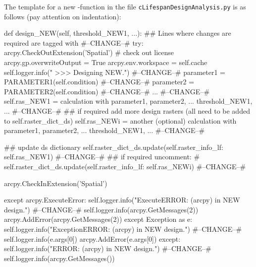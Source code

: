 \clearpage
The template for a new -function in the file \texttt{cLifespanDesignAnalysis.py} is as follows (pay attention on indentation):\\
\begin{python}
 def design_NEW(self, threshold_NEW1, ...):
     ## Lines where changes are required are tagged with #--CHANGE--#
     try:
      arcpy.CheckOutExtension('Spatial')  # check out license
      arcpy.gp.overwriteOutput = True
      arcpy.env.workspace = self.cache
      self.logger.info("      >>> Designing NEW.") #--CHANGE--#
      parameter1 = PARAMETER1(self.condition)      #--CHANGE--#
      parameter2 = PARAMETER2(self.condition)      #--CHANGE--#
      ...                                          #--CHANGE--#
      self.ras_NEW1 = calculation with parameter1, parameter2, ... threshold_NEW1, ...  #--CHANGE--#
      ## if required add more design rasters (all need to be added to self.raster_dict_ds)
      self.ras_NEWi = another (optional) calculation with parameter1, parameter2, ... threshold_NEW1, ... #--CHANGE--#

      ## update ds dictionary
      self.raster_dict_ds.update({self.raster_info_lf: self.ras_NEW1}) #--CHANGE--#
      ## if required uncomment:
      # self.raster_dict_ds.update({self.raster_info_lf: self.ras_NEWi}) #--CHANGE--#

      arcpy.CheckInExtension('Spatial')

     except arcpy.ExecuteError:
        self.logger.info("ExecuteERROR: (arcpy) in NEW design.")    #--CHANGE--#
        self.logger.info(arcpy.GetMessages(2))
        arcpy.AddError(arcpy.GetMessages(2))
     except Exception as e:
        self.logger.info("ExceptionERROR: (arcpy) in NEW design.")  #--CHANGE--#
        self.logger.info(e.args[0])
        arcpy.AddError(e.args[0])
     except:
        self.logger.info("ERROR: (arcpy) in NEW design.")           #--CHANGE--#
        self.logger.info(arcpy.GetMessages())
\end{python}

\clearpage
